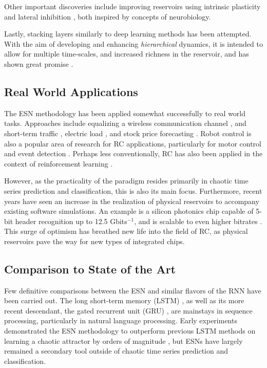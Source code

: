 Other important discoveries include improving reservoirs using intrinsic
plasticity \cite{schrauwen_improving_2008} and lateral inhibition
\cite{xue_decoupled_2007}, both inspired by concepts of neurobiology.

Lastly, stacking layers similarly to deep learning methods has been
attempted. With the aim of developing and enhancing \textit{hierarchical}
dynamics, it is intended to allow for multiple time-scales, and increased
richness in the reservoir, and has shown great promise
\cite{gallicchio_deep_2017}.

\subsection{Real World Applications}

The ESN methodology has been applied somewhat successfully to real world
tasks. Approaches include equalizing a wireless communication channel
\cite{jaeger_harnessing_2004}, and short-term traffic \cite{an_short-term_2011},
electric load \cite{song_hourly_2011}, and stock price forecasting
\cite{lin_short-term_2009}. Robot control is also a popular area of research for
RC applications, particularly for motor control and event detection
\cite{aislan_antonelo_learning_2015, harding_evolution_2005,
hutchison_movement_2004}. Perhaps less conventionally, RC has also been applied
in the context of reinforcement learning \cite{bush_modeling_2005}.

However, as the practicality of the paradigm resides primarily in chaotic time
series prediction and classification, this is also its main focus. Furthermore,
recent years have seen an increase in the realization of physical reservoirs to
accompany existing software simulations. An example is a silicon photonics chip
capable of 5-bit header recognition up to 12.5 Gbits$^{-1}$, and is scalable to
even higher bitrates \cite{vandoorne_experimental_2014}. This surge of optimism
has breathed new life into the field of RC, as physical reservoirs pave the way
for new types of integrated chips.

\subsection{Comparison to State of the Art}

Few definitive comparisons between the ESN and similar flavors of the RNN have
been carried out. The long short-term memory (LSTM) \cite{hochreiter_long_1997},
as well as its more recent descendant, the gated recurrent unit (GRU)
\cite{cho_learning_2014}, are mainstays in sequence processing, particularly in
natural language processing. Early experiments demonstrated the ESN methodology
to outperform previous LSTM methods on learning a chaotic attractor by orders of
magnitude \cite{jaeger_echo_2001}, but ESNs have largely remained a secondary
tool outside of chaotic time series prediction and classification.

